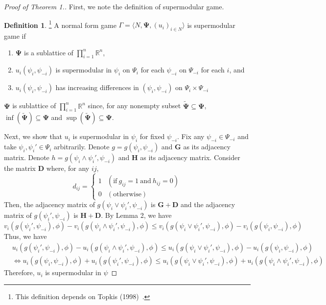 \documentclass[12pt]{article}
\theoremstyle{definition}
\newtheorem{definition}{Definition}
\newcommand{\bm}[1]{\boldsymbol{#1}}
\begin{document}
\begin{proof}[Proof of Theorem 1.]
	First, we note the definition of supermodular game.

	\begin{definition}\footnote{This definition depends on Topkis (1998)~\cite{topkis1998}.}
		A normal form game $\Gamma = \langle N, \bm{\Psi}, {(u_i)}_{i \in N} \rangle$ is supermodular game if
		\begin{enumerate}
			\item $\bm{\Psi}$ is a sublattice of $\prod_{i=1}^n \mathbb{R}^n$, 
			\item $u_i(\psi_i, \psi_{-i})$ is supermodular in $\psi_i$ on $\Psi_i$ for each $\psi_{-i}$ on $\Psi_{-i}$ for each $i$, and
			\item $u_i(\psi_i, \psi_{-i})$ has increasing differences in $(\psi_i, \psi_{-i})$ on $\Psi_i \times \Psi_{-i}$
		\end{enumerate}
	\end{definition}

	$\bm{\Psi}$ is sublattice of $\prod_{i=1}^n \mathbb{R}^n$ since, for any nonempty subset $\bm{\tilde{\Psi}} \subseteq \bm{\Psi}$, $\inf(\bm{\tilde{\Psi}}) \subseteq \bm{\Psi}$ and $\sup(\bm{\tilde{\Psi}}) \subseteq \bm{\Psi}$.

	Next, we show that $u_i$ is supermodular in $\psi_i$ for fixed $\psi_{-i}$.
	Fix any $\psi_{-i} \in \Psi_{-i}$ and take $\psi_i, \psi_i' \in \Psi_i$ arbitrarily.
	Denote $g = g(\psi_i, \psi_{-i})$ and $\bm{G}$ as its adjacency matrix.
	Denote $h = g(\psi_i \wedge \psi_i', \psi_{-i})$ and $\bm{H}$ as its adjacency matrix.
	Consider the matrix $\bm{D}$ where, for any $ij$,
	\[ d_{ij} = \begin{cases}
					1 & (\text{if} \ g_{ij} = 1 \ \text{and} \ h_{ij} = 0) \\
					0 & (\text{otherwise})
				\end{cases} \]
	Then, the adjacency matrix of $g(\psi_i \vee \psi_i', \psi_{-i})$ is $\bm{G} + \bm{D}$ and the adjacency matrix of $g(\psi_i', \psi_{-i})$ is $\bm{H} + \bm{D}$.
	By Lemma 2, we have
	\[ v_i(g(\psi_i', \psi_{-i}), \phi) - v_i(g(\psi_i \wedge \psi_i', \psi_{-i}), \phi) \le v_i(g(\psi_i \vee \psi_i', \psi_{-i}), \phi) - v_i(g(\psi_i, \psi_{-i}), \phi) \]
	Thus, we have
	\begin{align*}
	& u_i(g(\psi_i', \psi_{-i}), \phi) - u_i(g(\psi_i \wedge \psi_i', \psi_{-i}), \phi) \le u_i(g(\psi_i \vee \psi_i', \psi_{-i}), \phi) - u_i(g(\psi_i, \psi_{-i}), \phi) \\
		& \Leftrightarrow u_i(g(\psi_i, \psi_{-i}), \phi) + u_i(g(\psi_i', \psi_{-i}), \phi) \le u_i(g(\psi_i \vee \psi_i', \psi_{-i}), \phi) + u_i(g(\psi_i \wedge \psi_i', \psi_{-i}), \phi) 
	\end{align*}
	Therefore, $u_i$ is supermodular in $\psi$


\end{proof}
\end{document}

